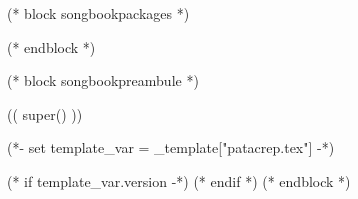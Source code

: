 (* block songbookpackages *)
\usepackage[
    (* for option in _bookoptions *)((option)),
    (* endfor *)
    ]{crepbook}
(* endblock *)

(* block songbookpreambule *)
\usepackage[
     a4paper %
     ,includeheadfoot %
     ,hmarginratio=1:1 %
     ,outer=1.8cm %
     ,vmarginratio=1:1 %
     ,bmargin=1.3cm %
     ]{geometry}

(( super() ))

\pagestyle{empty}

(*- set template_var = _template["patacrep.tex"] -*)


\renewcommand{\snumbgcolor}{SongNumberBgColor}
\renewcommand{\notebgcolor}{NoteBgColor}
\renewcommand{\idxbgcolor}{IndexBgColor}

\let\sgdfprintsongnum\printsongnum
\renewcommand{\printsongnum}[1]{\textcolor{white}{\sgdfprintsongnum{#1}}}
\let\sgdfnotefont\notefont
\renewcommand{\notefont}{\sgdfnotefont\color{white}}
\let\sgdfidxheadfont\idxheadfont
\renewcommand{\idxheadfont}{\sgdfidxheadfont\color{white}}

\usepackage[
    bookmarks,
    bookmarksopen,
    hyperfigures=true,
    colorlinks=true,
    linkcolor=SongLinkColor,
    urlcolor=HyperlinkColor,
    unicode=true
    ]{hyperref}


\subtitle{(( template_var.subtitle|escape_specials ))}
(* if template_var.version -*)
(* endif *)
\makeatletter
\def\@metainfos{%
    \ialign{%
        \bf{##} \hfil & ## \hfil \cr
        \@insertelement{version}
        \@insertelement{date}
        \@insertelement{author}
        \@insertelement{web}
    }
}
\makeatother
{}
(* endblock *)
